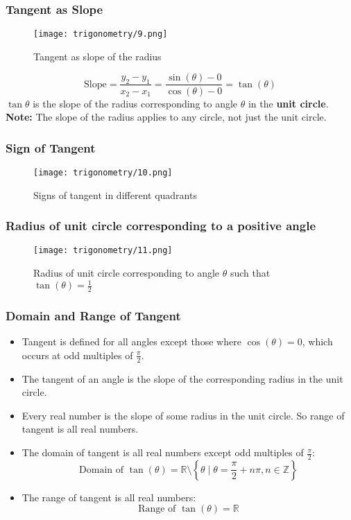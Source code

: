 \documentclass{beamer}
\begin{document}
\begin{frame}
    \frametitle{Tangent as Slope}
    \begin{figure}
        \centering
        \texttt{[image: trigonometry/9.png]}
        \caption{Tangent as slope of the radius}
    \end{figure}
    \centering
    \[ 
        \text{Slope} = \frac{y_{2} - y_{1}}{x_{2} - x_{1}} = \frac{\sin(\theta) - 0}{\cos(\theta) - 0} = \tan(\theta)
    \]
    \(\tan \theta\) is the slope of the radius corresponding to angle \(\theta\) in the \textbf{unit circle}.
    \textbf{Note:} The slope of the radius applies to any circle, not just the unit circle.
\end{frame}

\begin{frame}
    \frametitle{Sign of Tangent}
    \begin{figure}
        \centering
        \texttt{[image: trigonometry/10.png]}
        \caption{Signs of tangent in different quadrants}
    \end{figure}
\end{frame}

\begin{frame}
    \frametitle{Radius of unit circle corresponding to a positive angle}
    \begin{figure}
        \centering
        \texttt{[image: trigonometry/11.png]}
        \caption{Radius of unit circle corresponding to angle \(\theta\) such that \(\tan(\theta) = \frac{1}{2}\)}
    \end{figure}
\end{frame}

\begin{frame}
    \frametitle{Domain and Range of Tangent}
    \begin{itemize}
        \item Tangent is defined for all angles except those where \(\cos(\theta) = 0\), which occurs at odd multiples of \(\frac{\pi}{2}\).
        \item The tangent of an angle is the slope of the corresponding radius in the unit circle.
        \item Every real number is the slope of some radius in the unit circle. So range of tangent is all real numbers.
        \item The domain of tangent is all real numbers except odd multiples of \(\frac{\pi}{2}\):
        \[\text{Domain of } \tan(\theta) = \mathbb{R} \setminus \left\{ \theta \mid \theta = \frac{\pi}{2} + n\pi, n \in \mathbb{Z} \right\}\]
        \item The range of tangent is all real numbers:
        \[\text{Range of } \tan(\theta) = \mathbb{R}\]  
    \end{itemize}

\end{frame} 
\end{document}
